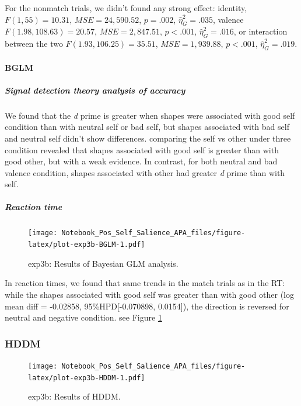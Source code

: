 \documentclass[
  english,
  man]{apa6}
\let\oldparagraph\paragraph
\renewcommand{\paragraph}[1]{\oldparagraph{#1}\mbox{}}
\let\oldsubparagraph\subparagraph
\renewcommand{\subparagraph}[1]{\oldsubparagraph{#1}\mbox{}}
\begin{document}
For the nonmatch trials, we didn't found any strong effect: identity, \(F(1, 55) = 10.31\), \(\mathit{MSE} = 24,590.52\), \(p = .002\), \(\hat{\eta}^2_G = .035\), valence \(F(1.98, 108.63) = 20.57\), \(\mathit{MSE} = 2,847.51\), \(p < .001\), \(\hat{\eta}^2_G = .016\), or interaction between the two \(F(1.93, 106.25) = 35.51\), \(\mathit{MSE} = 1,939.88\), \(p < .001\), \(\hat{\eta}^2_G = .019\).

\hypertarget{bglm-3}{%
\paragraph{BGLM}\label{bglm-3}}

\hypertarget{signal-detection-theory-analysis-of-accuracy-5}{%
\subparagraph{Signal detection theory analysis of accuracy}\label{signal-detection-theory-analysis-of-accuracy-5}}

We found that the \emph{d} prime is greater when shapes were associated with good self condition than with neutral self or bad self, but shapes associated with bad self and neutral self didn't show differences. comparing the self vs other under three condition revealed that shapes associated with good self is greater than with good other, but with a weak evidence. In contrast, for both neutral and bad valence condition, shapes associated with other had greater \emph{d} prime than with self.

\hypertarget{reaction-time-7}{%
\subparagraph{Reaction time}\label{reaction-time-7}}

\begin{figure}
\centering
\texttt{[image: Notebook\_Pos\_Self\_Salience\_APA\_files/figure-latex/plot-exp3b-BGLM-1.pdf]}
\caption{\label{fig:plot-exp3b-BGLM}exp3b: Results of Bayesian GLM analysis.}
\end{figure}

In reaction times, we found that same trends in the match trials as in the RT: while the shapes associated with good self was greater than with good other (log mean diff = -0.02858, 95\%HPD{[}-0.070898, 0.0154{]}), the direction is reversed for neutral and negative condition. see Figure \ref{fig:plot-exp3b-BGLM}

\hypertarget{hddm-5}{%
\subsubsection{HDDM}\label{hddm-5}}

\begin{figure}
\centering
\texttt{[image: Notebook\_Pos\_Self\_Salience\_APA\_files/figure-latex/plot-exp3b-HDDM-1.pdf]}
\caption{\label{fig:plot-exp3b-HDDM}exp3b: Results of HDDM.}
\end{figure}
\end{document}
